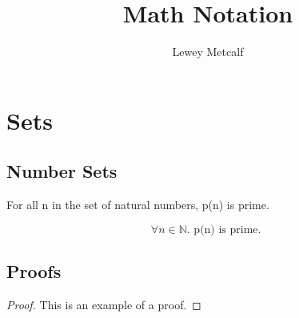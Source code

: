 \documentclass{article}
\begin{document}
\title{Math Notation}

\author{Lewey Metcalf}

\maketitle

\section{Sets}

\subsection{Number Sets}

For all n in the set of natural numbers, p(n) is prime.

\[\forall n \in \mathbb{N}.\textrm{ p(n) is prime. }\]

\subsection{Proofs}

\begin{proof}
This is an example of a proof.
\end{proof}
\end{document}
